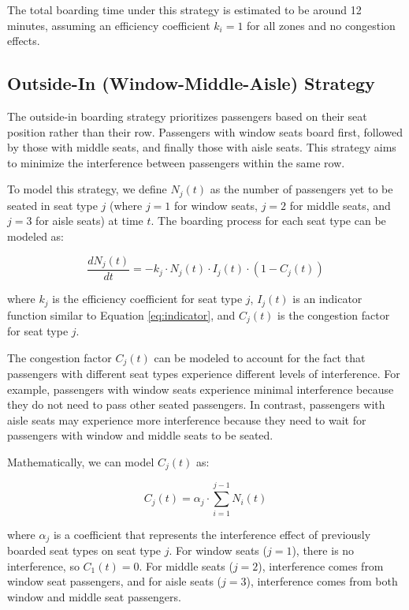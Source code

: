 \documentclass[12pt,a4paper]{article}
\begin{document}
The total boarding time under this strategy is estimated to be around 12 minutes, assuming an efficiency coefficient $k_i = 1$ for all zones and no congestion effects.

\subsection{Outside-In (Window-Middle-Aisle) Strategy}

The outside-in boarding strategy prioritizes passengers based on their seat position rather than their row. Passengers with window seats board first, followed by those with middle seats, and finally those with aisle seats. This strategy aims to minimize the interference between passengers within the same row.

To model this strategy, we define $N_j(t)$ as the number of passengers yet to be seated in seat type $j$ (where $j = 1$ for window seats, $j = 2$ for middle seats, and $j = 3$ for aisle seats) at time $t$. The boarding process for each seat type can be modeled as:

\begin{equation}
\frac{dN_j(t)}{dt} = -k_j \cdot N_j(t) \cdot I_j(t) \cdot (1 - C_j(t))
\label{eq:seat_type_boarding}
\end{equation}

where $k_j$ is the efficiency coefficient for seat type $j$, $I_j(t)$ is an indicator function similar to Equation \ref{eq:indicator}, and $C_j(t)$ is the congestion factor for seat type $j$.

The congestion factor $C_j(t)$ can be modeled to account for the fact that passengers with different seat types experience different levels of interference. For example, passengers with window seats experience minimal interference because they do not need to pass other seated passengers. In contrast, passengers with aisle seats may experience more interference because they need to wait for passengers with window and middle seats to be seated.

Mathematically, we can model $C_j(t)$ as:

\begin{equation}
C_j(t) = \alpha_j \cdot \sum_{i=1}^{j-1} N_i(t)
\label{eq:seat_type_congestion}
\end{equation}

where $\alpha_j$ is a coefficient that represents the interference effect of previously boarded seat types on seat type $j$. For window seats ($j = 1$), there is no interference, so $C_1(t) = 0$. For middle seats ($j = 2$), interference comes from window seat passengers, and for aisle seats ($j = 3$), interference comes from both window and middle seat passengers.
\end{document}
